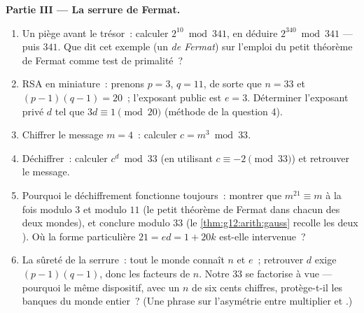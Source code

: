\begin{problem}
\medskip
\noindent\textbf{Partie III --- La serrure de Fermat.}
\begin{enumerate}[resume]
  \item Un piège avant le trésor~: calculer $2^{10} \bmod 341$, en
        déduire $2^{340} \bmod 341$ --- puis  $341$. Que
        dit cet exemple (un \emph{ de Fermat}) sur
        l'emploi du petit théorème de Fermat comme test de
        primalité~?
  \item RSA en miniature~: prenons $p = 3$, $q = 11$, de sorte que
        $n = 33$ et $(p-1)(q-1) = 20$~; l'exposant public est
        $e = 3$. Déterminer l'exposant privé $d$ tel que
        $3d \equiv 1 \pmod{20}$ (méthode de la question 4).
  \item Chiffrer le message $m = 4$~: calculer
        $c = m^3 \bmod 33$.
  \item Déchiffrer~: calculer $c^d \bmod 33$ (en utilisant
        $c \equiv -2 \pmod{33}$) et retrouver le message.
  \item Pourquoi le déchiffrement fonctionne toujours~: montrer que
        $m^{21} \equiv m$ à la fois modulo $3$ et modulo $11$ (le
        petit théorème de Fermat dans chacun des deux mondes), et
        conclure modulo $33$ (le \cref{thm:g12:arith:gauss} recolle
        les deux ). Où la forme particulière
        $21 = ed = 1 + 20k$ est-elle intervenue~?
  \item La sûreté de la serrure~: tout le monde connaît $n$ et
        $e$~; retrouver $d$ exige $(p-1)(q-1)$, donc les facteurs de
        $n$. Notre $33$ se factorise à vue --- pourquoi le même
        dispositif, avec un $n$ de six cents chiffres, protège-t-il
        les banques du monde entier~? (Une phrase sur l'asymétrie
        entre multiplier et .)
\end{enumerate}


\end{problem}
